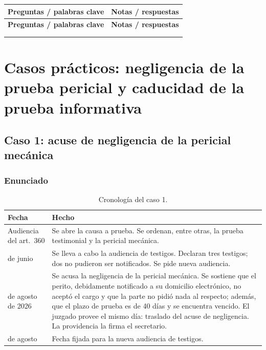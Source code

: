 \documentclass[12pt,oneside]{book}
\newlength{\cornellizq}
\newlength{\cornellder}
\newenvironment{cornell}
{\begin{longtable}{>{\columncolor{gray!10}\raggedright\arraybackslash}p{\cornellizq}>{\raggedright\arraybackslash}p{\cornellder}}
\toprule
\textbf{Preguntas / palabras clave} & \textbf{Notas / respuestas} \\
\midrule
\endfirsthead
\toprule
\textbf{Preguntas / palabras clave} & \textbf{Notas / respuestas} \\
\midrule
\endhead
\midrule
\multicolumn{2}{r}{\footnotesize\itshape Continúa en la página siguiente} \\
\endfoot
\endlastfoot}
{\end{longtable}}
\begin{document}
\begin{cornell}
\addlinespace
\midrule
\rowcolor{blue!5}
\multicolumn{2}{>{\raggedright\arraybackslash}p{\dimexpr\cornellizq+\cornellder+2\tabcolsep\relax}}{%
\textbf{Resumen.} La regla es la notificación por ministerio de la ley y la excepción, la cédula. Cuando el despacho no dice «notifíquese», rige el régimen de días de nota (martes y viernes), cuyo ritual protege el derecho de defensa. El proceso laboral exige integración normativa con el Código Procesal. Frente a una providencia se puede resistir o consentir, y el allanamiento debe ser expreso según el docente.} \\
\bottomrule
\end{cornell}

\chapter[Casos prácticos]{Casos prácticos: negligencia de la prueba pericial y caducidad de la prueba informativa}

\section{Caso 1: acuse de negligencia de la pericial mecánica}

\subsection{Enunciado}

\begin{table}[H]
\centering
\begin{tabularx}{\textwidth}{
    >{\raggedright\arraybackslash}p{}
    >{\raggedright\arraybackslash}X
}
\toprule
\textbf{Fecha} & \textbf{Hecho} \\
\midrule
Audiencia del art.~360 &
Se abre la causa a prueba. Se ordenan, entre otras, la prueba testimonial y la pericial mecánica. \\
\addlinespace
25 de junio &
Se lleva a cabo la audiencia de testigos. Declaran tres testigos; dos no pudieron ser notificados. Se pide nueva audiencia. \\
\addlinespace
4 de agosto de 2026 &
Se acusa la negligencia de la pericial mecánica. Se sostiene que el perito, debidamente notificado a su domicilio electrónico, no aceptó el cargo y que la parte no pidió nada al respecto; además, que el plazo de prueba es de 40 días y se encuentra vencido. El juzgado provee el mismo día: traslado del acuse de negligencia. La providencia la firma el secretario. \\
\addlinespace
14 de agosto &
Fecha fijada para la nueva audiencia de testigos. \\
\bottomrule
\end{tabularx}
\caption*{Cronología del caso 1.}
\end{table}
\end{document}
